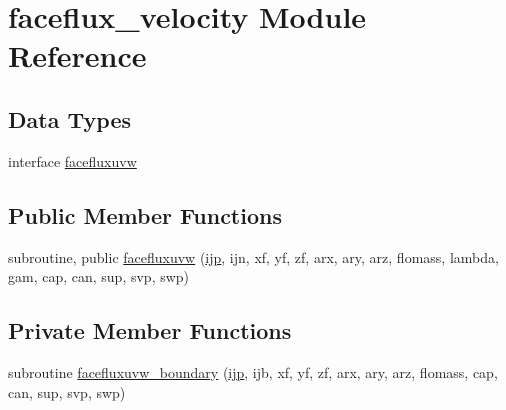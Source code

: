 \hypertarget{classfaceflux__velocity}{\section{faceflux\-\_\-velocity Module Reference}
\label{classfaceflux__velocity}
}
\subsection*{Data Types}
\begin{DoxyCompactItemize}
\item 
interface \hyperlink{interfacefaceflux__velocity_1_1facefluxuvw}{facefluxuvw}
\end{DoxyCompactItemize}
\subsection*{Public Member Functions}
\begin{DoxyCompactItemize}
\item 
subroutine, public \hyperlink{classfaceflux__velocity_ae05a209571d2c349b0ecd18c8476dfad}{facefluxuvw} (\hyperlink{CourantNo_8h_accea320a458bb8759c7ece360e05ddf4}{ijp}, ijn, xf, yf, zf, arx, ary, arz, flomass, lambda, gam, cap, can, sup, svp, swp)
\end{DoxyCompactItemize}
\subsection*{Private Member Functions}
\begin{DoxyCompactItemize}
\item 
subroutine \hyperlink{classfaceflux__velocity_a1a47191b7f9978400d8b19fac879aec6}{facefluxuvw\-\_\-boundary} (\hyperlink{CourantNo_8h_accea320a458bb8759c7ece360e05ddf4}{ijp}, ijb, xf, yf, zf, arx, ary, arz, flomass, cap, can, sup, svp, swp)
\end{DoxyCompactItemize}


